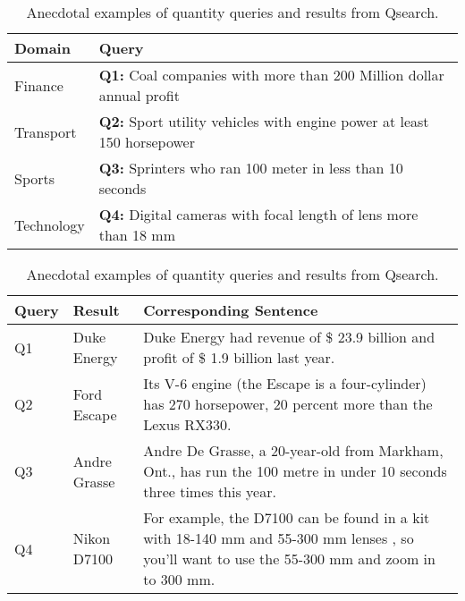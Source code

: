 \begin{table}[t]
	\caption{Anecdotal examples of quantity queries and results from Qsearch.}	
	\small	
	\begin{tabular}{p{} p{}} 	 \hline
		Domain & Query \\ \hline
		Finance & \textbf{Q1:} Coal companies with more than 200 Million dollar annual profit\\ 
		Transport & \textbf{Q2:} Sport utility vehicles with engine power at least 150 horsepower \\  
		Sports & \textbf{Q3:} Sprinters who ran 100 meter in less than 10 seconds  \\  
		Technology & \textbf{Q4:} Digital cameras with focal length of lens more than 18 mm\\ \bottomrule 
	\end{tabular}
	\small
	\begin{tabular}{p{} p{} p{}} 
	 \hline
		Query & Result & Corresponding Sentence \\ \hline
		Q1& Duke Energy & Duke Energy had revenue of \$ 23.9 billion and profit of \$ 1.9 billion last year.\\ \hline
		
		Q2 & Ford Escape & Its V-6 engine (the Escape is a four-cylinder) has 270 horsepower, 20 percent more than the Lexus RX330. \\ \hline
		Q3 & Andre Grasse & Andre De Grasse, a 20-year-old from Markham, Ont., has run the 100 metre in under 10 seconds three times this year. \\ \hline
		Q4 & Nikon D7100 & For example, the D7100 can be found in a kit with 18-140 mm and 55-300 mm lenses , so you'll want to use the 55-300 mm and zoom in to 300 mm. \\
		\bottomrule
	\end{tabular}	
	\label{table:example_qa}
\end{table}